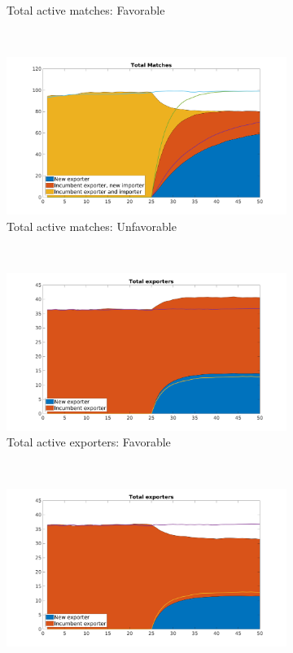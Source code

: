 \documentclass[12pt]{article}
\begin{document}
\begin{figure}[tbp]
\begin{subfigure}[b]{0.5\textwidth}
        \caption{Total active matches: Favorable}
    \end{subfigure} ~ 
\begin{subfigure}[b]{0.5\textwidth}
        \centering
        \includegraphics[width=\textwidth]{figures/total_matches_unf}
        \caption{Total active matches: Unfavorable}
    \end{subfigure} \newline
~ 
\begin{subfigure}[b]{0.5\textwidth}
        \centering
        \includegraphics[width=\textwidth]{figures/total_firms}
        \caption{Total active exporters: Favorable}
    \end{subfigure} ~ 
\begin{subfigure}[b]{0.5\textwidth}
        \centering
        \includegraphics[width=\textwidth]{figures/total_firms_unf}

\end{subfigure}
\end{figure}
\end{document}

